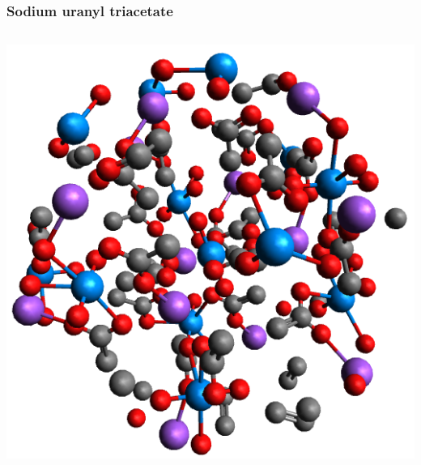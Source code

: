 \documentclass[10pt, xcolor=x11names, compress]{beamer}
\begin{document}
\begin{frame}[fragile]
  \frametitle{Sodium uranyl triacetate}
  \begin{columns}[T]
    \begin{column}{0.3\linewidth}
      \includegraphics[width=\linewidth]{../ATEA/mfc/NaU_triacetate_full.png}


\end{column}
\end{columns}
\end{frame}
\end{document}
